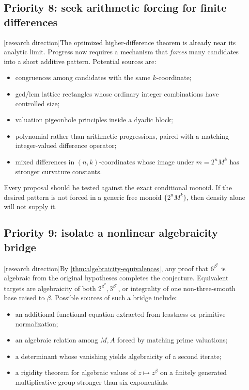 \documentclass[11pt,oneside]{article}
\theoremstyle{definition}
\newcommand{\tagProposal}{\textcolor{BrickRed}{\textsf{[research direction]}}}
\begin{document}
\subsection{Priority 8: seek arithmetic forcing for finite differences}

\tagProposal The optimized higher-difference theorem is already near its analytic limit.
Progress now requires a mechanism that \emph{forces} many candidates into a short additive
pattern.  Potential sources are:
\begin{itemize}
\item congruences among candidates with the same \(k\)-coordinate;
\item gcd/lcm lattice rectangles whose ordinary integer combinations have controlled size;
\item valuation pigeonhole principles inside a dyadic block;
\item polynomial rather than arithmetic progressions, paired with a matching integer-valued
difference operator;
\item mixed differences in \((n,k)\)-coordinates whose image under
\(m=2^nM^k\) has stronger curvature constants.
\end{itemize}

Every proposal should be tested against the exact conditional monoid.  If the desired
pattern is not forced in a generic free monoid \(\{2^nM^k\}\), then density alone will not
supply it.

\subsection{Priority 9: isolate a nonlinear algebraicity bridge}

\tagProposal By \cref{thm:algebraicity-equivalences}, any proof that
\(6^{\beta^2}\) is algebraic from the original hypotheses completes the conjecture.
Equivalent targets are algebraicity of both \(2^{\beta^2},3^{\beta^2}\), or integrality of
one non-three-smooth base raised to \(\beta\).  Possible sources of such a bridge include:
\begin{itemize}
\item an additional functional equation extracted from leastness or primitive
normalization;
\item an algebraic relation among \(M,A\) forced by matching prime valuations;
\item a determinant whose vanishing yields algebraicity of a second iterate;
\item a rigidity theorem for algebraic values of \(z\mapsto z^\beta\) on a finitely
generated multiplicative group stronger than six exponentials.
\end{itemize}
\end{document}
